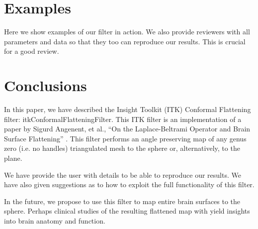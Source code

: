 \documentclass{InsightArticle}
\begin{document}
\section{Examples}

Here we show examples of our filter in action.  We also provide
reviewers with all parameters and data so that they too can reproduce
our results.  This is crucial for a good review.


\section{Conclusions}
In this paper, we have described the Insight Toolkit (ITK) Conformal
Flattening filter: itkConformalFlatteningFilter. This ITK filter is an
implementation of a paper by Sigurd Angenent, et al., ``On the
Laplace-Beltrami Operator and Brain Surface Flattening''
\cite{angenent1999lbo}. This filter performs an angle preserving map of any
genus zero (i.e. no handles) triangulated mesh to the sphere or,
alternatively, to the plane.

We have provide the user with details to be able to reproduce our
results. We have also given suggestions as to how to exploit the full
functionality of this filter.

In the future, we propose to use this filter to map entire brain
surfaces to the sphere. Perhaps clinical studies of the resulting
flattened map with yield insights into brain anatomy and function.






%
%
%
%
%
%
%
%
\end{document}
